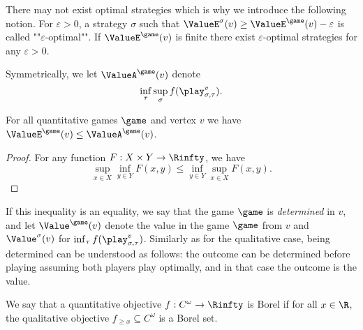 There may not exist optimal strategies which is why we introduce the following notion.
For $\varepsilon > 0$, a strategy $\sigma$ such that $\ValueE^\sigma(v) \ge \ValueE^{\game}(v) - \varepsilon$
is called ""$\varepsilon$-optimal"".
If $\ValueE^{\game}(v)$ is finite there exist $\varepsilon$-optimal strategies for any $\varepsilon > 0$.

Symmetrically, we let $\ValueA^{\game}(v)$ denote 
\[
\inf_{\tau} \sup_{\sigma} f(\play_{\sigma,\tau}^{v}).
\]
\begin{fact}
\label{1-fact:comparaison_values_eve_adam}
For all quantitative games $\game$ and vertex $v$ we have $\ValueE^{\game}(v) \le \ValueA^{\game}(v)$.
\end{fact}
\begin{proof}
For any function $F : X \times Y \to \Rinfty$, we have 
\[
\sup_{x \in X} \inf_{y \in Y} F(x,y) \le \inf_{y \in Y} \sup_{x \in X} F(x,y).
\]
\end{proof}

If this inequality is an equality, we say that the game $\game$ is \textit{determined} in $v$,
and let $\Value^{\game}(v)$ denote the value in the game $\game$ from $v$
and $\Value^\sigma(v)$ for $\inf_{\tau} f(\play_{\sigma,\tau}^{v})$.
Similarly as for the qualitative case, being determined can be understood as follows: the outcome can be determined before playing assuming both players play optimally, and in that case the outcome is the value.

We say that a quantitative objective $f : C^\omega \to \Rinfty$ is Borel if for all $x \in \R$,
the qualitative objective $f_{\ge x} \subseteq C^\omega$ is a Borel set.

